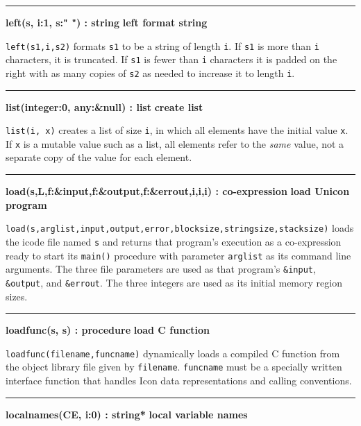 \bigskip\hrule\vspace{0.1cm}
\noindent
{\bf left(s, i:1, s:" ") : string } \hfill {\bf left format string}

\noindent
{}\texttt{left(s1,i,s2)} formats \texttt{s1} to be a string
of length \texttt{i}. If \texttt{s1} is more than \texttt{i}
characters, it is truncated. If \texttt{s1} is fewer than \texttt{i}
characters it is padded on the right with as many copies of \texttt{s2}
as needed to increase it to length \texttt{i}.

\bigskip\hrule\vspace{0.1cm}
\noindent
{\bf list(integer:0, any:\&null) : list } \hfill {\bf create list}

\noindent
{}\texttt{list(i, x)} creates a list of size \texttt{i},
in which all elements have the initial value \texttt{x}. If \texttt{x}
is a mutable value such as a list, all elements refer to the
\textit{same} value, not a separate copy of the value for each element.

\bigskip\hrule\vspace{0.1cm}
\noindent
{\bf load(s,L,f:\&input,f:\&output,f:\&errout,i,i,i) : co-expression } \hfill {\bf load Unicon program}

\noindent
{}
\texttt{load(s,arglist,input,output,error,blocksize,stringsize,stacksize)}
loads the icode file named \texttt{s} and returns that
program's execution as a co-expression ready to start
its \texttt{main()} procedure with parameter \texttt{arglist} as its
command line arguments. The three file parameters are used as that
program's \texttt{\&input}, \texttt{\&output}, and
\texttt{\&errout}. The three integers are used as its initial memory
region sizes.

\bigskip\hrule\vspace{0.1cm}
\noindent
{\bf loadfunc(s, s) : procedure } \hfill {\bf load C function}

\noindent
{}\texttt{loadfunc(filename,funcname)} dynamically
loads a compiled C function from the object library file given by
\texttt{filename}. \texttt{funcname} must be a specially written
interface function that handles Icon data representations and calling
conventions.

\bigskip\hrule\vspace{0.1cm}
\noindent
{\bf localnames(CE, i:0) : string* } \hfill {\bf local variable names}

